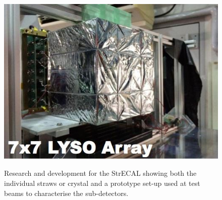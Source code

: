 {\begin{figure}[p]
{       \includegraphics[height=0.19\textheight,trim=0 2cm 0 0,clip]{figs/detector/status_photos/ECAL-testBeam}
}
\caption{
Research and development for the \ac{StrECAL} showing both the individual straws or crystal and a prototype set-up used at test beams to characterise the sub-detectors.
}
\end{figure}
}
